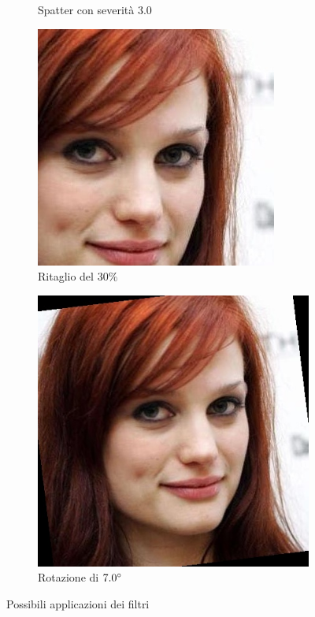 \begin{figure}[h]
\begin{subfigure}{0.2\textwidth}
\caption{Spatter con severità $3.0$}
\label{sfig:corruption_spatter}
\end{subfigure}\hfill
\begin{subfigure}{0.2\textwidth}
\includegraphics[width=\textwidth]{./Images/random_crop_severity_0.3.jpg}
\caption{Ritaglio del $30\%$}
\label{sfig:corruption_random_crop}
\end{subfigure}\hfill
\begin{subfigure}{0.2\textwidth}
\includegraphics[width=\textwidth]{./Images/rotation_severity_7.0.jpg}
\caption{Rotazione di $7.0 \degree$}
\label{sfig:corruption_rotation}
\end{subfigure}\hfill
\caption{Possibili applicazioni dei filtri}
\label{sfig:data_augmentation}
\end{figure}

